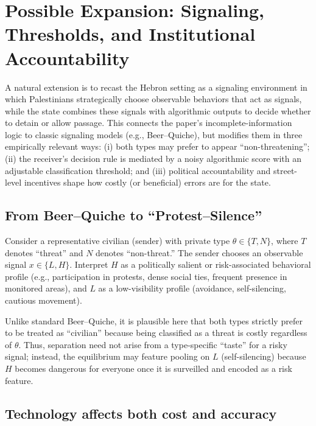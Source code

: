 \documentclass[11pt,a4paper]{article}
\theoremstyle{definition}
\theoremstyle{remark}
\theoremstyle{definition}
\begin{document}

\section{Possible Expansion: Signaling, Thresholds, and Institutional Accountability}

A natural extension is to recast the Hebron setting as a signaling environment in which Palestinians strategically choose observable behaviors
that act as signals, while the state combines these signals with algorithmic outputs to decide whether to detain or allow passage. This connects the
paper's incomplete-information logic to classic signaling models (e.g., Beer--Quiche), but modifies them in three empirically relevant ways:
(i) both types may prefer to appear ``non-threatening'';
(ii) the receiver's decision rule is mediated by a noisy algorithmic score with an adjustable classification threshold; and
(iii) political accountability and street-level incentives shape how costly (or beneficial) errors are for the state.

\subsection{From Beer--Quiche to ``Protest--Silence''}

Consider a representative civilian (sender) with private type $\theta \in \{T,N\}$, where $T$ denotes ``threat'' and $N$ denotes ``non-threat.''
The sender chooses an observable signal $x \in \{L,H\}$.
Interpret $H$ as a politically salient or risk-associated behavioral profile (e.g., participation in protests, dense social ties, frequent presence in
monitored areas), and $L$ as a low-visibility profile (avoidance, self-silencing, cautious movement).

Unlike standard Beer--Quiche, it is plausible here that both types strictly prefer to be treated as ``civilian'' because being classified as a threat
is costly regardless of $\theta$. Thus, separation need not arise from a type-specific ``taste'' for a risky signal; instead, the equilibrium may
feature pooling on $L$ (self-silencing) because $H$ becomes dangerous for everyone once it is surveilled and encoded as a risk feature.


\subsection{Technology affects both cost and accuracy}
\end{document}

